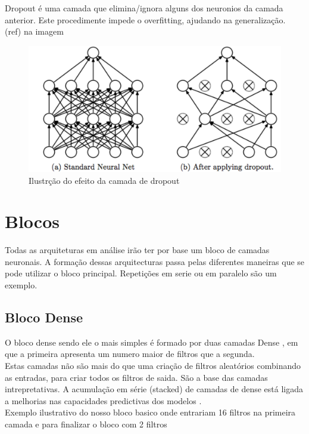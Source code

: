 Dropout é uma camada que elimina/ignora alguns dos neuronios da camada anterior. Este procedimente impede o overfitting, ajudando na generalização. \\
(ref) na imagem
\begin{figure}[H]
	\centering
	\includegraphics{Imagens/dropout.png}
	\caption{Ilustrção do efeito da camada de dropout}
	\label{fig:dropout}
\end{figure}



\section{Blocos\label{se:blocos}}

Todas as arquiteturas em análise irão ter por base um bloco de camadas neuronais. A formação dessas arquitecturas passa pelas diferentes maneiras que se pode utilizar o bloco principal. Repetições em serie ou em paralelo são um exemplo. \\

\subsection{Bloco Dense\label{se:dense}}

O bloco dense sendo ele o mais simples é formado por duas camadas Dense \cite{}, em que a primeira apresenta um numero maior de filtros que a segunda. \\
Estas camadas não são mais do que uma criação de filtros aleatórios combinando as entradas, para criar todos os filtros de saida. São a base das camadas intrepretativas. A acumulação em série (stacked) de camadas de dense está ligada a melhorias nas capacidades predictivas dos modelos \cite{VLHelen2021}. \\
Exemplo ilustrativo do nosso bloco basico onde entrariam 16 filtros na primeira camada e para finalizar o bloco com 2 filtros \\

